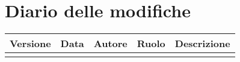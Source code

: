 \vspace*{-5mm}
\section*{Diario delle modifiche}

\begin{longtable} { >{\centering}p{1.4cm} >{\centering}p{2cm} >{\centering}p{2.3cm} >{\centering}p{2.7cm} p{5.5cm} }
	\toprule
	\textbf{Versione} & \textbf{Data} & \textbf{Autore} & \textbf{Ruolo} & \centerline{\textbf{Descrizione}} \\
	\midrule
	\arrayrulecolor{gray}


\end{longtable}
